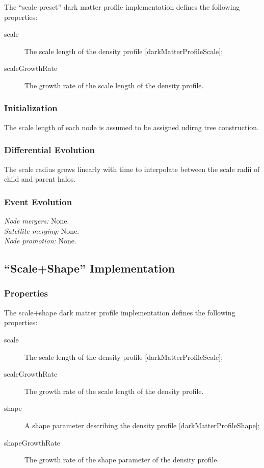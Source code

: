 The ``scale preset'' dark matter profile implementation defines the following properties:
\begin{description}
 \item [{\normalfont \ttfamily scale}] The scale length of the density profile [{\normalfont \ttfamily darkMatterProfileScale}];
 \item [{\normalfont \ttfamily scaleGrowthRate}] The growth rate of the scale length of the density profile.
\end{description}

\subsubsection{Initialization}

The scale length of each node is assumed to be assigned udirng tree construction.

\subsubsection{Differential Evolution}

The scale radius grows linearly with time to interpolate between the scale radii of child and parent halos.

\subsubsection{Event Evolution}

\noindent\emph{Node mergers:} None.\\

\noindent\emph{Satellite merging:} None.\\

\noindent\emph{Node promotion:} None.\\

\subsection{``Scale+Shape'' Implementation}\label{sec:DarkMatterProfileScaleShape}

\subsubsection{Properties}

The scale$+$shape dark matter profile implementation defines the following properties:
\begin{description}
 \item [{\normalfont \ttfamily scale}] The scale length of the density profile [{\normalfont \ttfamily darkMatterProfileScale}];
 \item [{\normalfont \ttfamily scaleGrowthRate}] The growth rate of the scale length of the density profile.
 \item [{\normalfont \ttfamily shape}] A shape parameter describing the density profile [{\normalfont \ttfamily darkMatterProfileShape}];
 \item [{\normalfont \ttfamily shapeGrowthRate}] The growth rate of the shape parameter of the density profile.
\end{description}

